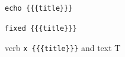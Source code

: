 \begin{verbatim}
echo {{{title}}}
\end{verbatim}
\begin{verbatim}
fixed {{{title}}}
\end{verbatim}
verb \texttt{x \{\{\{title\}\}\}} and text T
